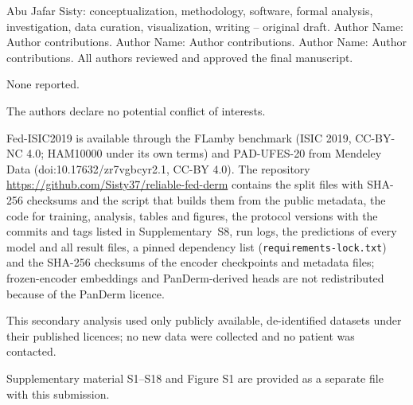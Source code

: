 Abu Jafar Sisty: conceptualization, methodology, software, formal analysis, investigation, data
curation, visualization, writing -- original draft. Author Name: Author contributions. Author Name:
Author contributions. Author Name: Author contributions. All authors reviewed and approved the final
manuscript. %


None reported. %

The authors declare no potential conflict of interests.

Fed-ISIC2019 is available through the FLamby benchmark (ISIC 2019, CC-BY-NC 4.0; HAM10000 under its own
terms) and PAD-UFES-20 from Mendeley Data (doi:10.17632/zr7vgbcyr2.1, CC-BY 4.0). The repository
\url{https://github.com/Sisty37/reliable-fed-derm} contains the split files with SHA-256 checksums and the
script that builds them from the public metadata, the code for training, analysis, tables and figures,
the protocol versions with the commits and tags listed in Supplementary~S8, run logs, the predictions of every model and
all result files, a pinned dependency list (\texttt{requirements-lock.txt}) and the SHA-256 checksums of the
encoder checkpoints and metadata files; frozen-encoder embeddings and PanDerm-derived heads are not redistributed because of the
PanDerm licence. %

This secondary analysis used only publicly available, de-identified datasets under their published
licences; no new data were collected and no patient was contacted. %




Supplementary material S1--S18 and Figure S1 are provided as a separate file with this submission.
